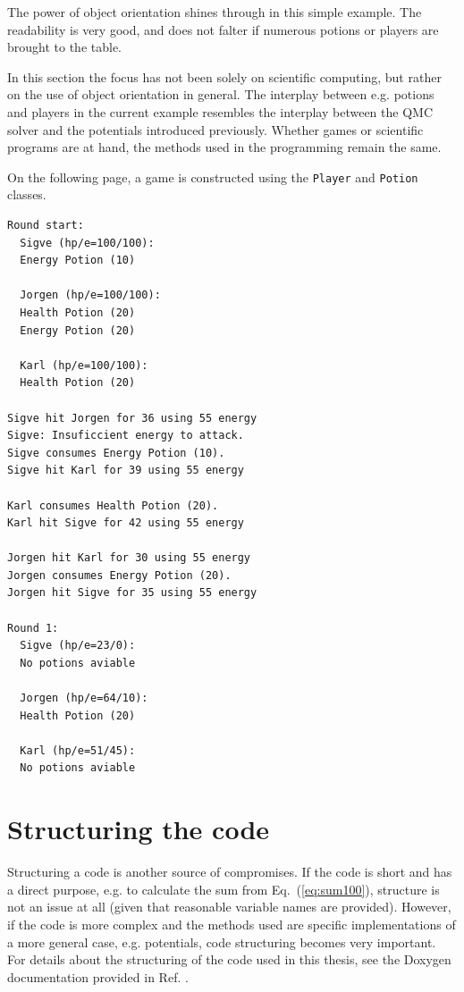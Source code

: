 The power of object orientation shines through in this simple example. The readability is very good, and does not falter if numerous potions or players are brought to the table.

In this section the focus has not been solely on scientific computing, but rather on the use of object orientation in general. The interplay between e.g. potions and players in the current example resembles the interplay between the QMC solver and the potentials introduced previously. Whether games or scientific programs are at hand, the methods used in the programming remain the same. 

On the following page, a game is constructed using the \verb+Player+ and \verb+Potion+ classes. 
 
\clearpage


\scriptsize
\begin{verbatim}
Round start: 
  Sigve (hp/e=100/100):
  Energy Potion (10)

  Jorgen (hp/e=100/100):
  Health Potion (20)
  Energy Potion (20)

  Karl (hp/e=100/100):
  Health Potion (20)

Sigve hit Jorgen for 36 using 55 energy
Sigve: Insuficcient energy to attack.
Sigve consumes Energy Potion (10).
Sigve hit Karl for 39 using 55 energy

Karl consumes Health Potion (20).
Karl hit Sigve for 42 using 55 energy

Jorgen hit Karl for 30 using 55 energy
Jorgen consumes Energy Potion (20).
Jorgen hit Sigve for 35 using 55 energy

Round 1: 
  Sigve (hp/e=23/0):
  No potions aviable

  Jorgen (hp/e=64/10):
  Health Potion (20)

  Karl (hp/e=51/45):
  No potions aviable
\end{verbatim}
\clearpage
\normalsize

\section{Structuring the code}

Structuring a code is another source of compromises. If the code is short and has a direct purpose, e.g. to calculate the sum from Eq.~(\ref{eq:sum100}), structure is not an issue at all (given that reasonable variable names are provided). However, if the code is more complex and the methods used are specific implementations of a more general case, e.g. potentials, code structuring becomes very important. For details about the structuring of the code used in this thesis, see the Doxygen documentation provided in Ref. \cite{libBorealisCode}. 

